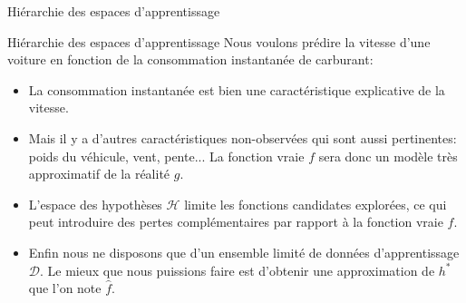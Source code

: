 \documentclass[10pt]{beamer}  %
\begin{document}
\begin{frame}[fragile]{Hiérarchie des espaces d'apprentissage}
	\hspace*{+1.0cm}
\end{frame}

\begin{frame}{Hiérarchie des espaces d'apprentissage}
	Nous voulons prédire la vitesse d'une voiture en fonction de la consommation instantanée de carburant:
	\pause
	\begin{itemize}
		\item La consommation instantanée est bien une caractéristique explicative de la vitesse.
		\pause
		\item Mais il y a d'autres caractéristiques non-observées qui sont aussi pertinentes: poids du véhicule, vent, pente... La fonction vraie $f$ sera donc un modèle très approximatif de la réalité $g$.
		\pause
		\item L'espace des hypothèses $\mathcal{H}$ limite les fonctions candidates explorées, ce qui peut introduire des pertes complémentaires par rapport à la fonction vraie $f$.
		\pause
		\item Enfin nous ne disposons que d'un ensemble limité de données d'apprentissage $\mathcal{D}$. Le mieux que nous puissions faire est d'obtenir une approximation de $h^{*}$ que l'on note $\hat{f}$.
	\end{itemize}
\end{frame}
\end{document}
